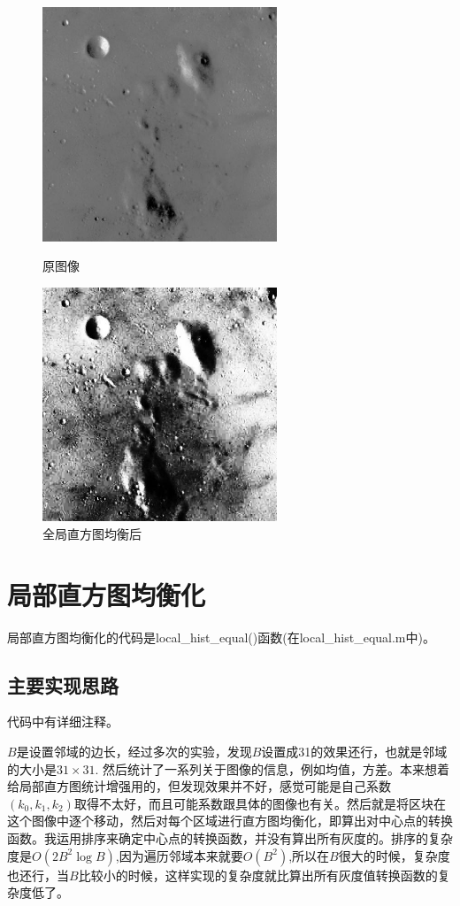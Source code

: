 \documentclass[11pt, a4paper, UTF8]{ctexart}
\begin{document}
\begin{figure}[H]
  \centering
  \begin{minipage}[t]{0.48\textwidth}
  \centering
  \includegraphics[width=7cm]{gray_moon.jpg}
  \caption{原图像}
  \end{minipage}
  \begin{minipage}[t]{0.48\textwidth}
  \centering
  \includegraphics[width=7cm]{gray_moon_global_converted.jpg}
  \caption{全局直方图均衡后}
  \end{minipage}
\end{figure}
  


\section{局部直方图均衡化}

局部直方图均衡化的代码是local\_hist\_equal()函数(在local\_hist\_equal.m中)。

\subsection{主要实现思路}
代码中有详细注释。\par
$B$是设置邻域的边长，经过多次的实验，发现$B$设置成31的效果还行，也就是邻域的大小是$31 \times 31$. 然后统计了一系列关于图像的信息，例如均值，方差。本来想着给局部直方图统计增强用的，但发现效果并不好，感觉可能是自己系数$(k_0,k_1,k_2)$取得不太好，而且可能系数跟具体的图像也有关。然后就是将区块在这个图像中逐个移动，然后对每个区域进行直方图均衡化，即算出对中心点的转换函数。我运用排序来确定中心点的转换函数，并没有算出所有灰度的。排序的复杂度是$O(2B^2\log B)$,因为遍历邻域本来就要$O(B^2)$,所以在$B$很大的时候，复杂度也还行，当$B$比较小的时候，这样实现的复杂度就比算出所有灰度值转换函数的复杂度低了。
\end{document}
